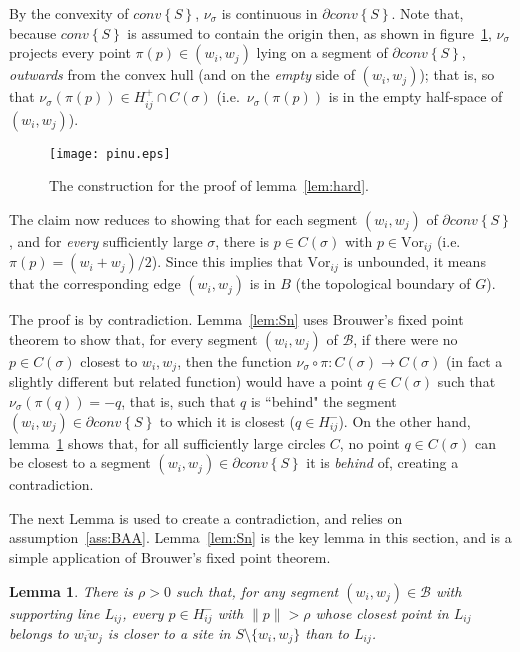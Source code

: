 \documentclass[11pt]{article}
\newtheorem{lemma}{Lemma}
\newcommand{\Sites}{S}
\newcommand{\Vor}{\text{Vor}}
\newcommand{\CHS}{{conv}\left\{\Sites\right\}}
\begin{document}
By the convexity of $\CHS$, $\nu_\sigma$ is continuous in $\partial\CHS$. 
Note that, because $\CHS$ is assumed to contain the origin then, 
	as shown in figure~\ref{fig:pinu}, $\nu_\sigma$ projects 
every point $\pi(p)\in (w_i,w_j)$ lying on a segment of $\partial\CHS$, 
\emph{outwards} from the convex hull (and on the \emph{empty} side of
$(w_i,w_j)$); that is, so that $\nu_\sigma(\pi(p))\in H^{+}_{ij}\cap C(\sigma)$
(i.e.~$\nu_\sigma(\pi(p))$ is in the empty half-space of $(w_i,w_j)$). 

\begin{figure}[htbp]
   \centering
   	\texttt{[image: pinu.eps]} \caption{The construction for the proof of lemma~\ref{lem:hard}.}
   \label{fig:pinu}
\end{figure}



The claim now reduces to showing that for each segment 
	$(w_i,w_j)$ of $\partial\CHS$, and for \emph{every} sufficiently large $\sigma$, 
there is $p\in C(\sigma)$ with $p\in\Vor_{ij}$ (i.e.~$\pi(p)=(w_i+w_j)/2$). 
Since this implies that $\Vor_{ij}$ is unbounded, 
	it means that the corresponding edge $(w_i,w_j)$ is in $B$ (the topological boundary of $G$).

The proof is by contradiction. 
Lemma~\ref{lem:Sn} uses Brouwer's fixed point theorem to show that, for every segment $(w_i,w_j)$ of $\mathcal{B}$, 
if there were no $p\in C(\sigma)$ closest to $w_i,w_j$, then the function $\nu_\sigma\circ\pi:C(\sigma)\rightarrow C(\sigma)$ 
(in fact a slightly different but related function) 
would have a point $q\in C(\sigma)$ such that
$\nu_\sigma(\pi(q))=-q$, that is, such that 
$q$ is ``behind" the segment $(w_i,w_j)\in\partial\CHS$ to which it is
closest ($q\in H^{-}_{ij}$). 
On the other hand, lemma~\ref{lem:contrad} shows that, for all sufficiently large circles $C$, no
point $q\in C(\sigma)$ can be closest to a segment
$(w_i,w_j)\in\partial\CHS$ it is \emph{behind} of, creating a contradiction. 



The next Lemma is used to create a contradiction, and relies on assumption~\ref{ass:BAA}. 
Lemma~\ref{lem:Sn} is the key lemma in this section, and is a simple application of Brouwer's fixed point theorem. 

\begin{lemma}\label{lem:contrad}
There is $\rho > 0$ such that, for any segment $(w_i,w_j)\in\mathcal{B}$ with supporting line $L_{ij}$, 
	 every $p\in H^{-}_{ij}$ with $\|p\| > \rho$ whose closest point in $L_{ij}$ belongs to $\overline{w_i w_j}$ is 
	closer to a site in $\Sites\setminus\{w_i,w_j\}$ than to $L_{ij}$.
\end{lemma}
\end{document}
